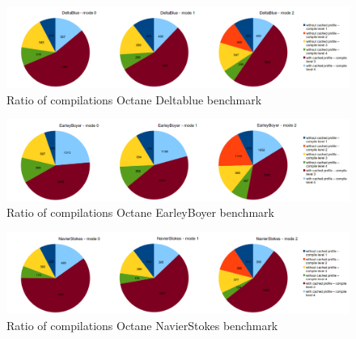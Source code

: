 \begin{figure}[ht]
  \begin{center}
    \centering
    \includegraphics[width=1.0\textwidth]{figures/deltablue_compilations.png}
    \caption{Ratio of compilations Octane Deltablue benchmark}
    \label{f:deltablue_compilations}
  \end{center}
\end{figure}
\begin{figure}[ht]
  \begin{center}
    \centering
    \includegraphics[width=1.0\textwidth]{figures/earleyboyer_compilations.png}
    \caption{Ratio of compilations Octane EarleyBoyer benchmark}
    \label{f:earleyboyer_compilations}
  \end{center}
\end{figure}
\begin{figure}[ht]
  \begin{center}
    \centering
    \includegraphics[width=1.0\textwidth]{figures/navierstokes_compilations.png}
    \caption{Ratio of compilations Octane NavierStokes benchmark}
    \label{f:navierstokes_compilations}
  \end{center}
\end{figure}
